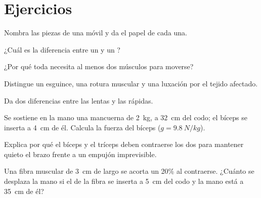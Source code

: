 \section{Ejercicios}

\begin{exercise}[$\star$]\label{exo:g10:muscles-and-joints:1}
Nombra las piezas de una  móvil y da el papel de cada una.
\end{exercise}

\begin{exercise}[$\star$]\label{exo:g10:muscles-and-joints:2}
¿Cuál es la diferencia entre un  y un ?
\end{exercise}

\begin{exercise}[$\star$]\label{exo:g10:muscles-and-joints:3}
¿Por qué toda  necesita al menos dos músculos para moverse?
\end{exercise}

\begin{exercise}[$\star$]\label{exo:g10:muscles-and-joints:4}
Distingue un esguince, una rotura muscular y una luxación por el tejido
afectado.
\end{exercise}

\begin{exercise}[$\star$]\label{exo:g10:muscles-and-joints:5}
Da dos diferencias entre las  lentas y las rápidas.
\end{exercise}

\begin{exercise}[$\star\star$]\label{exo:g10:muscles-and-joints:6}
Se sostiene en la mano una mancuerna de \qty{2}{kg}, a \qty{32}{cm} del
codo; el bíceps se inserta a \qty{4}{cm} de él. Calcula la fuerza del
bíceps ($g = \qty{9.8}{N/kg}$).
\end{exercise}

\begin{exercise}[$\star\star$]\label{exo:g10:muscles-and-joints:7}
Explica por qué el bíceps y el tríceps deben contraerse los dos para
mantener quieto el brazo frente a un empujón imprevisible.
\end{exercise}

\begin{exercise}[$\star\star$]\label{exo:g10:muscles-and-joints:8}
Una fibra muscular de \qty{3}{cm} de largo se acorta un 20\% al
contraerse. ¿Cuánto se desplaza la mano si el  de la fibra se
inserta a \qty{5}{cm} del codo y la mano está a \qty{35}{cm} de él?
\end{exercise}

